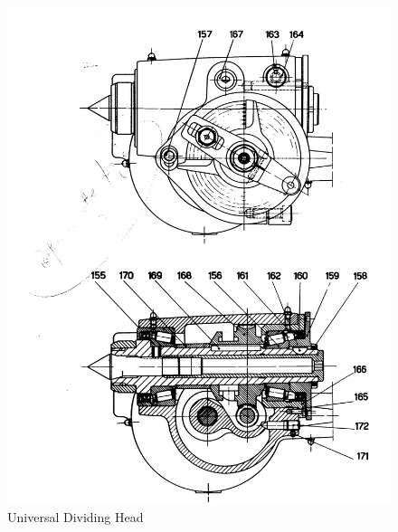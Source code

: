 \newpage
\begin{figure}[h]
    \centering
    \includegraphics[width=1.0\linewidth]{images/page_51}
    \caption{Universal Dividing Head}
    \label{fig:universal_dividing_head}
\end{figure}
